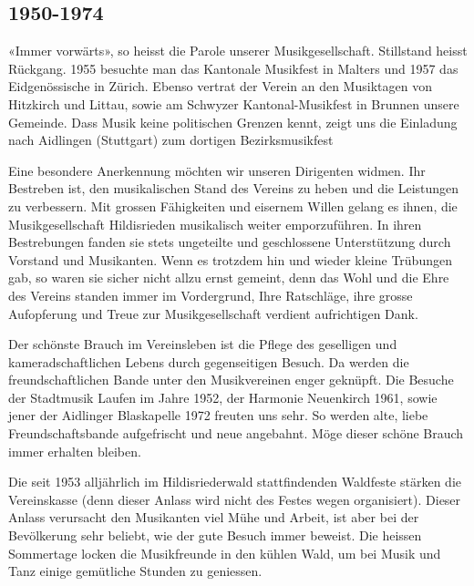 \begin{multicols}{2}

    \subsection{1950-1974}

    «Immer vorwärts», so heisst die Parole unserer Musikgesellschaft.
    Stillstand heisst Rückgang. 1955 besuchte
    man das Kantonale Musikfest in Malters und 1957
    das Eidgenössische in Zürich. Ebenso vertrat der Verein
    an den Musiktagen von Hitzkirch und Littau, sowie
    am Schwyzer Kantonal-Musikfest in Brunnen unsere
    Gemeinde. Dass Musik keine politischen Grenzen kennt,
    zeigt uns die Einladung nach Aidlingen (Stuttgart) zum
    dortigen Bezirksmusikfest

    Eine besondere Anerkennung möchten wir unseren
    Dirigenten widmen. Ihr Bestreben ist, den musikalischen
    Stand des Vereins zu heben und die Leistungen
    zu verbessern. Mit grossen Fähigkeiten und eisernem
    Willen gelang es ihnen, die Musikgesellschaft Hildisrieden
    musikalisch weiter emporzuführen. In ihren Bestrebungen
    fanden sie stets ungeteilte und geschlossene Unterstützung
    durch Vorstand und Musikanten. Wenn es trotzdem hin und wieder
    kleine Trübungen gab, so
    waren sie sicher nicht allzu ernst gemeint, denn das
    Wohl und die Ehre des Vereins standen immer im
    Vordergrund, Ihre Ratschläge, ihre grosse Aufopferung
    und Treue zur Musikgesellschaft verdient aufrichtigen
    Dank.

    Der schönste Brauch im Vereinsleben ist die Pflege des
    geselligen und kameradschaftlichen Lebens durch
    gegenseitigen Besuch. Da werden die freundschaftlichen
    Bande unter den Musikvereinen enger geknüpft. Die
    Besuche der Stadtmusik Laufen im Jahre 1952, der
    Harmonie Neuenkirch 1961, sowie jener der Aidlinger
    Blaskapelle 1972 freuten uns sehr. So werden alte,
    liebe Freundschaftsbande aufgefrischt und neue angebahnt.
    Möge dieser schöne Brauch immer erhalten
    bleiben.

    Die seit 1953 alljährlich im Hildisriederwald stattfindenden
    Waldfeste stärken die Vereinskasse (denn
    dieser Anlass wird nicht des Festes wegen organisiert).
    Dieser Anlass verursacht den Musikanten viel Mühe
    und Arbeit, ist aber bei der Bevölkerung sehr beliebt,
    wie der gute Besuch immer beweist. Die heissen
    Sommertage locken die Musikfreunde in den kühlen
    Wald, um bei Musik und Tanz einige gemütliche
    Stunden zu geniessen.


\end{multicols}
